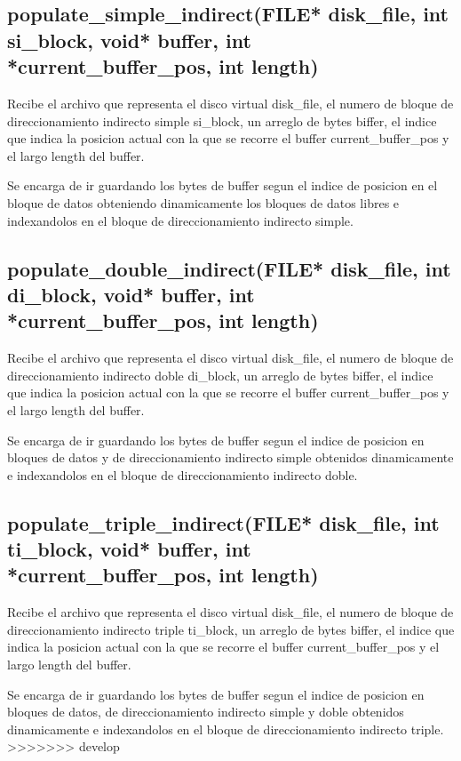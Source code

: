 \documentclass[12pt]{article}
\begin{document}
\subsection{populate\_simple\_indirect(FILE* disk\_file, int si\_block, void* buffer, int *current\_buffer\_pos, int length)}
Recibe el archivo que representa el disco virtual disk\_file, el numero de bloque de direccionamiento indirecto simple si\_block, un arreglo de bytes biffer, el indice que indica la posicion actual con la que se recorre el buffer current\_buffer\_pos y el largo length del buffer.

Se encarga de ir guardando los bytes de buffer segun el indice de posicion en el bloque de datos obteniendo dinamicamente los bloques de datos libres e indexandolos en el bloque de direccionamiento indirecto simple.


\subsection{populate\_double\_indirect(FILE* disk\_file, int di\_block, void* buffer, int *current\_buffer\_pos, int length)}
Recibe el archivo que representa el disco virtual disk\_file, el numero de bloque de direccionamiento indirecto doble di\_block, un arreglo de bytes biffer, el indice que indica la posicion actual con la que se recorre el buffer current\_buffer\_pos y el largo length del buffer.

Se encarga de ir guardando los bytes de buffer segun el indice de posicion en bloques de datos y de direccionamiento indirecto simple obtenidos dinamicamente e indexandolos en el bloque de direccionamiento indirecto doble.


\subsection{populate\_triple\_indirect(FILE* disk\_file, int ti\_block, void* buffer, int *current\_buffer\_pos, int length)}
Recibe el archivo que representa el disco virtual disk\_file, el numero de bloque de direccionamiento indirecto triple ti\_block, un arreglo de bytes biffer, el indice que indica la posicion actual con la que se recorre el buffer current\_buffer\_pos y el largo length del buffer.

Se encarga de ir guardando los bytes de buffer segun el indice de posicion en bloques de datos, de direccionamiento indirecto simple y doble obtenidos dinamicamente e indexandolos en el bloque de direccionamiento indirecto triple.
>>>>>>> develop
\end{document}
